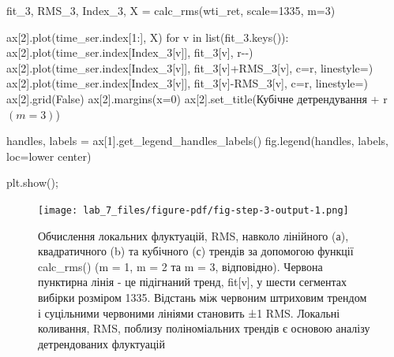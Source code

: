 \documentclass[
  letterpaper,
]{report}
\newenvironment{Shaded}{\begin{snugshade}}{\end{snugshade}}
\newcommand{\BuiltInTok}[1]{\textcolor[rgb]{0.00,0.23,0.31}{#1}}
\newcommand{\ControlFlowTok}[1]{\textcolor[rgb]{0.00,0.23,0.31}{#1}}
\newcommand{\DecValTok}[1]{\textcolor[rgb]{0.68,0.00,0.00}{#1}}
\newcommand{\KeywordTok}[1]{\textcolor[rgb]{0.00,0.23,0.31}{#1}}
\newcommand{\NormalTok}[1]{\textcolor[rgb]{0.00,0.23,0.31}{#1}}
\newcommand{\OperatorTok}[1]{\textcolor[rgb]{0.37,0.37,0.37}{#1}}
\newcommand{\StringTok}[1]{\textcolor[rgb]{0.13,0.47,0.30}{#1}}
\newcommand{\VariableTok}[1]{\textcolor[rgb]{0.07,0.07,0.07}{#1}}
\newcommand{\VerbatimStringTok}[1]{\textcolor[rgb]{0.13,0.47,0.30}{#1}}
\begin{document}
\begin{Shaded}
\begin{Highlighting}[]
\NormalTok{fit\_3, RMS\_3, Index\_3, X }\OperatorTok{=}\NormalTok{ calc\_rms(wti\_ret, scale}\OperatorTok{=}\DecValTok{1335}\NormalTok{, m}\OperatorTok{=}\DecValTok{3}\NormalTok{)}

\NormalTok{ax[}\DecValTok{2}\NormalTok{].plot(time\_ser.index[}\DecValTok{1}\NormalTok{:], X)}
\ControlFlowTok{for}\NormalTok{ v }\KeywordTok{in} \BuiltInTok{list}\NormalTok{(fit\_3.keys()):}
\NormalTok{    ax[}\DecValTok{2}\NormalTok{].plot(time\_ser.index[Index\_3[v]], fit\_3[v], }\StringTok{\textquotesingle{}r{-}{-}\textquotesingle{}}\NormalTok{)}
\NormalTok{    ax[}\DecValTok{2}\NormalTok{].plot(time\_ser.index[Index\_3[v]], fit\_3[v]}\OperatorTok{+}\NormalTok{RMS\_3[v], c}\OperatorTok{=}\StringTok{\textquotesingle{}r\textquotesingle{}}\NormalTok{, linestyle}\OperatorTok{=}\StringTok{\textquotesingle{}{-}\textquotesingle{}}\NormalTok{)}
\NormalTok{    ax[}\DecValTok{2}\NormalTok{].plot(time\_ser.index[Index\_3[v]], fit\_3[v]}\OperatorTok{{-}}\NormalTok{RMS\_3[v], c}\OperatorTok{=}\StringTok{\textquotesingle{}r\textquotesingle{}}\NormalTok{, linestyle}\OperatorTok{=}\StringTok{\textquotesingle{}{-}\textquotesingle{}}\NormalTok{)}
\NormalTok{ax[}\DecValTok{2}\NormalTok{].grid(}\VariableTok{False}\NormalTok{)}
\NormalTok{ax[}\DecValTok{2}\NormalTok{].margins(x}\OperatorTok{=}\DecValTok{0}\NormalTok{)}
\NormalTok{ax[}\DecValTok{2}\NormalTok{].set\_title(}\StringTok{\textquotesingle{}Кубічне детрендування \textquotesingle{}} \OperatorTok{+} \VerbatimStringTok{r\textquotesingle{}$(m=3)$\textquotesingle{}}\NormalTok{)}

\NormalTok{handles, labels }\OperatorTok{=}\NormalTok{ ax[}\DecValTok{1}\NormalTok{].get\_legend\_handles\_labels()}
\NormalTok{fig.legend(handles, labels, loc}\OperatorTok{=}\StringTok{\textquotesingle{}lower center\textquotesingle{}}\NormalTok{)}

\NormalTok{plt.show()}\OperatorTok{;}
\end{Highlighting}
\end{Shaded}

\begin{figure}[H]

{\centering \texttt{[image: lab\_7\_files/figure-pdf/fig-step-3-output-1.png]}

}

\caption{\label{fig-step-3}Обчислення локальних флуктуацій, RMS, навколо
лінійного (а), квадратичного (b) та кубічного (с) трендів за допомогою
функції calc\_rms() (m = 1, m = 2 та m = 3, відповідно). Червона
пунктирна лінія - це підігнаний тренд, fit{[}v{]}, у шести сегментах
вибірки розміром 1335. Відстань між червоним штриховим трендом і
суцільними червоними лініями становить ±1 RMS. Локальні коливання, RMS,
поблизу поліноміальних трендів є основою аналізу детрендованих
флуктуацій}

\end{figure}
\end{document}
